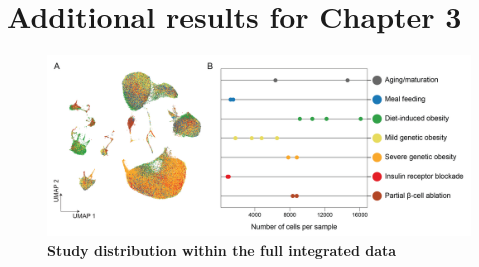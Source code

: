 

\section{Additional results for Chapter 3}

\begin{figure}[H]
\centering
\includegraphics[width=\linewidth]{Appendix2/Fig/F3-2-v2-02.png}
\caption[Study distribution within the full integrated data]{\textbf{Study distribution within the full integrated data}}
\label{suppl_fig:chp3_study}
\end{figure}

